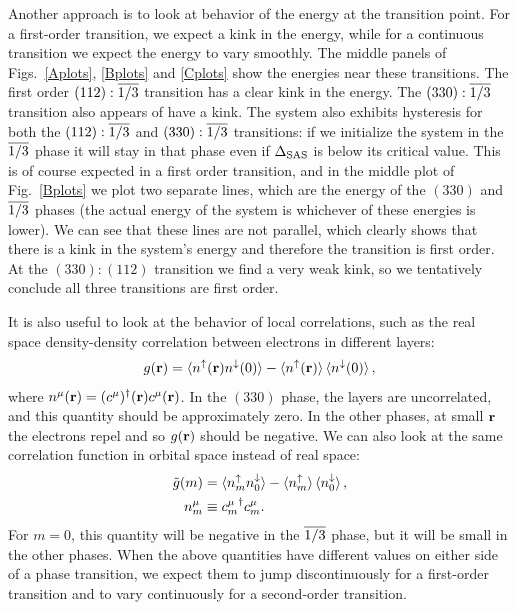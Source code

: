 Another approach is to look at behavior of the energy at the transition point. For a first-order transition, we expect a kink in the energy, while for a continuous transition we expect the energy to vary smoothly. The middle panels of Figs.~\ref{Aplots}, \ref{Bplots} and \ref{Cplots} show the energies near these transitions. 
The first order $(112):\overline{1/3}$ transition has a clear kink in the energy.
The $(330):\overline{1/3}$ transition also appears of have a kink. 
The system also exhibits hysteresis for both the $(112):\overline{1/3}$ and $(330):\overline{1/3}$ transitions: if we initialize the system in the $\overline{1/3}$ phase it will stay in that phase even if $\Delta_\textrm{SAS}$ is below its critical value. 
This is of course expected in a first order transition, and in the middle plot of Fig.~\ref{Bplots} we plot two separate lines, which are the energy of the $(330)$ and $\overline{1/3}$ phases (the actual energy of the system is whichever of these energies is lower). 
We can see that these lines are not parallel, which clearly shows that there is a kink in the system's energy and therefore the transition is first order.
At the $(330):(112)$ transition we find a very weak kink, so we tentatively conclude all three transitions are first order.

It is also useful to look at the behavior of local correlations, such as the real space density-density correlation between electrons in different layers:
\begin{align}
	{g}({\mathbf{r}})=\braket{ n^\uparrow({\mathbf{r}})n^\downarrow(0) } - \braket{n^\uparrow({\mathbf{r}})} \braket{n^\downarrow(0)},
\end{align}
where $n^\mu({\mathbf{r}})=(c^\mu)^\dagger({\mathbf{r}})c^\mu({\mathbf{r}})$.
In the $(330)$ phase, the layers are uncorrelated, and this quantity should be approximately zero. In the other phases, at small ${\mathbf{r}}$ the electrons repel and so ${g}({\mathbf{r}})$ should be negative. We can also look at the same correlation function in orbital space instead of real space:
\begin{align}\begin{split}
	{\tilde g}(m) &= \braket{ n^\uparrow_m n^\downarrow_0 } - \braket{n^\uparrow_m}\braket{n^\downarrow_0}, \\
	n^\mu_m &\equiv {c_m^\mu}^\dagger c^\mu_m.
\end{split}\end{align}
For $m=0$, this quantity will be negative in the $\overline{1/3}$ phase, but it will be small in the other phases. %
When the above quantities have different values on either side of a phase transition, we expect them to jump discontinuously for a first-order transition and to vary continuously for a second-order transition.

